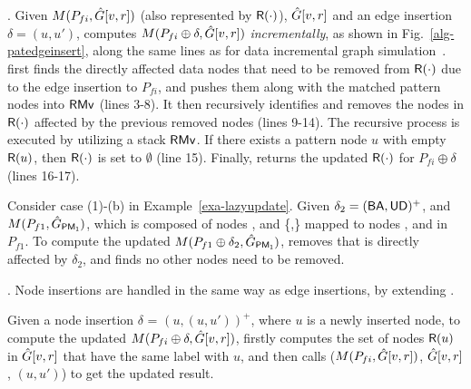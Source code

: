 .
Given $M(P_{fi}, \hat{G}{[v,r]})$ (also represented by ${\mathsf{R}}(\cdot)$), $\hat{G}{[v,r]}$ and an edge insertion $\delta=(u,u')$, \patedgeinsert computes $M(P_{fi}\oplus\delta, \hat{G}{[v,r]})$ {\em incrementally}, as shown in Fig.~\ref{alg-patedgeinsert},
along the same lines as for data incremental graph simulation~\cite{FanWW13-tods}.
\patedgeinsert first finds the directly affected data nodes that need to be removed from ${\mathsf{R}}(\cdot)$ due to the edge insertion to $P_{fi}$,
and pushes them along with the matched pattern nodes into ${\mathsf{RMv}}$ (lines 3-8).
It then recursively identifies and removes the nodes in ${\mathsf{R}}(\cdot)$ affected by the previous removed nodes (lines 9-14).
The recursive process is executed by utilizing a stack ${\mathsf{RMv}}$.
If there exists a pattern node $u$ with empty ${\mathsf{R}}(u)$, then ${\mathsf{R}}(\cdot)$ is set to $\emptyset$ (line 15).
Finally, \patedgeinsert returns the updated ${\mathsf{R}}(\cdot)$ for $P_{fi}\oplus \delta$ (lines 16-17).


\begin{example}
\label{exa-edge-insertion}
Consider case (1)-(b) in Example~\ref{exa-lazyupdate}.
Given $\delta_2 = ({\mathsf{BA}},{\mathsf{UD}})^+$, and $M(P_{f1}, \hat{G}{}_{{\mathsf{PM_1}}})$, which is composed of nodes ,  and \{,\} mapped to nodes ,  and  in $P_{f1}$.
To compute the updated $M(P_{f1}\oplus \delta_2, \hat{G}{}_{{\mathsf{PM_1}}})$,
\patedgeinsert removes  that is directly affected by $\delta_2$, and finds no other nodes need to be removed.
\end{example}



.
Node insertions are handled in the same way as edge insertions, by extending \patedgeinsert.

Given a node insertion $\delta$ = $(u,(u,u'))^+$, where $u$ is a newly inserted node,
to compute the updated $M(P_{fi}\oplus \delta, \hat{G}{[v,r]})$,
\incmatch firstly computes the set of nodes ${\mathsf{R}}(u)$ in $\hat{G}{[v,r]}$ that have the same label with $u$, and then calls \patedgeinsert($M(P_{fi}, \hat{G}{[v,r]})$, $\hat{G}{[v,r]}$, $(u,u')$) to get the updated result.

